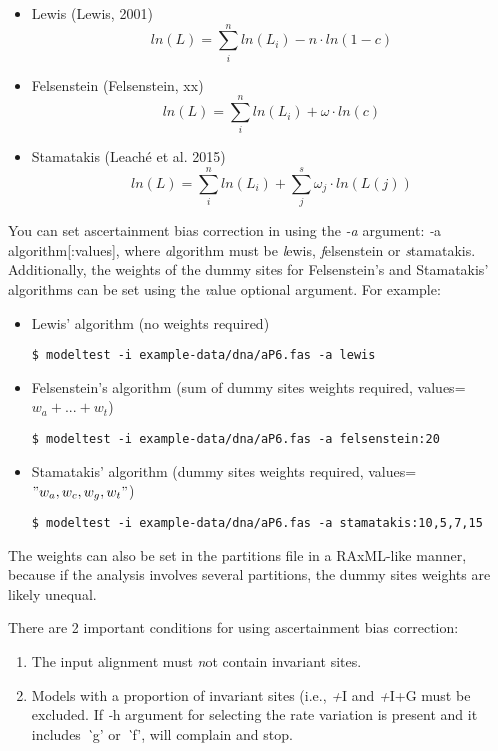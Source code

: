 \begin{itemize}
  \item Lewis (Lewis, 2001)
    \begin{equation}
      ln(L) = \sum\limits_{i}^{n}ln(L_i) - n \cdot ln(1-c)
    \end{equation}
  \item Felsenstein (Felsenstein, xx)
    \begin{equation}
      ln(L) = \sum\limits_{i}^{n}ln(L_i) + \omega \cdot ln(c)
    \end{equation}
  \item Stamatakis (Leach\'e et al. 2015)
    \begin{equation}
      ln(L) = \sum\limits_{i}^{n}ln(L_i) + \sum\limits_{j}^{s} \omega_j \cdot ln(L(j))
    \end{equation}
\end{itemize}

You can set ascertainment bias correction in {\modeltest} using the {\it -a} argument: {\emph -a algorithm[:values]},
where {\emph algorithm} must be {\emph lewis}, {\emph felsenstein} or {\emph stamatakis}.
Additionally, the weights of the dummy sites for Felsenstein's and Stamatakis' algorithms can be set using the {\emph value} optional argument.
For example:

\begin{itemize}
  \item Lewis' algorithm (no weights required)

  \texttt{\$ modeltest -i example-data/dna/aP6.fas -a lewis}

  \item Felsenstein's algorithm (sum of dummy sites weights required, values=${w_a + ... + w_t}$)

  \texttt{\$ modeltest -i example-data/dna/aP6.fas -a felsenstein:20}

  \item Stamatakis' algorithm (dummy sites weights required, values=$"w_a,w_c,w_g,w_t"$)

  \texttt{\$ modeltest -i example-data/dna/aP6.fas -a stamatakis:10,5,7,15}
\end{itemize}

The weights can also be set in the partitions file in a RAxML-like manner,
because if the analysis involves several partitions, the dummy sites weights are likely unequal.

There are 2 important conditions for using ascertainment bias correction:

\begin{enumerate}
\item The input alignment must {\emph not} contain invariant sites.
\item Models with a proportion of invariant sites (i.e., {\emph +I} and {\emph +I+G} must be excluded.
      If {\emph -h} argument for selecting the rate variation is present and it includes {\emph `g'} or {\emph `f'}, {\modeltest} will complain and stop.
\end{enumerate}

